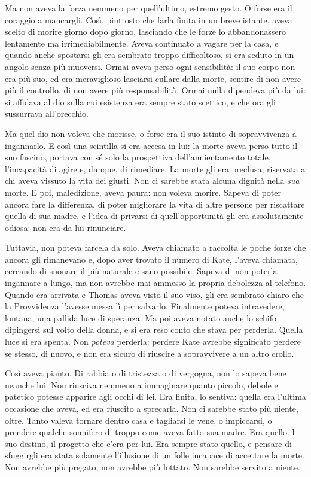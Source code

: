 \documentclass[a4paper,oneside,9pt]{memoir}
\begin{document}
Ma non aveva la forza nemmeno per quell'ultimo, estremo gesto. O forse era il coraggio a mancargli. Così, piuttosto che
farla finita in un breve istante, aveva scelto di morire giorno dopo giorno, lasciando che le forze lo abbandonassero
lentamente ma irrimediabilmente. Aveva continuato a vagare per la casa, e quando anche spostarsi gli era sembrato troppo
difficoltoso, si era seduto in un angolo senza più muoversi. Ormai aveva perso ogni sensibilità: il suo corpo non era
più suo, ed era meraviglioso lasciarsi cullare dalla morte, sentire di non avere più il controllo, di non avere più
responsabilità. Ormai nulla dipendeva più da lui: si affidava al dio sulla cui esistenza era sempre stato scettico, e
che ora gli sussurrava all'orecchio.

Ma quel dio non voleva che morisse, o forse era il suo istinto di sopravvivenza a ingannarlo. E così una scintilla si
era accesa in lui: la morte aveva perso tutto il suo fascino, portava con sé solo la prospettiva dell'annientamento
totale, l'incapacità di agire e, dunque, di rimediare. La morte gli era preclusa, riservata a chi aveva vissuto la vita
dei giusti. Non ci sarebbe stata alcuna dignità nella \emph{sua} morte. E poi, maledizione, aveva paura: non voleva
morire. Sapeva di poter ancora fare la differenza, di poter migliorare la vita di altre persone per riscattare quella di
sua madre, e l'idea di privarsi di quell'opportunità gli era assolutamente odiosa: non era da lui rinunciare.

Tuttavia, non poteva farcela da solo. Aveva chiamato a raccolta le poche forze che ancora gli rimanevano e, dopo aver
trovato il numero di Kate, l'aveva chiamata, cercando di suonare il più naturale e sano possibile. Sapeva di non poterla
ingannare a lungo, ma non avrebbe mai ammesso la propria debolezza al telefono. Quando era arrivata e Thomas aveva visto
il suo viso, gli era sembrato chiaro che la Provvidenza l'avesse messa lì per salvarlo. Finalmente poteva intravedere,
lontana, una pallida luce di speranza. Ma poi aveva notato anche lo schifo dipingersi sul volto della donna, e si era
reso conto che stava per perderla. Quella luce si era spenta. Non \emph{poteva} perderla: perdere Kate avrebbe
significato perdere se stesso, di nuovo, e non era sicuro di riuscire a sopravvivere a un altro crollo.

Così aveva pianto. Di rabbia o di tristezza o di vergogna, non lo sapeva bene neanche lui. Non riusciva nemmeno a
immaginare quanto piccolo, debole e patetico potesse apparire agli occhi di lei. Era finita, lo sentiva: quella era
l'ultima occasione che aveva, ed era riuscito a sprecarla. Non ci sarebbe stato più niente, oltre. Tanto valeva
tornare dentro casa e tagliarsi le vene, o impiccarsi, o prendere qualche sonnifero di troppo come aveva fatto sua
madre. Era quello il suo destino, il progetto che c'era per lui. Era sempre stato quello, e pensare di sfuggirgli era
stata solamente l'illusione di un folle incapace di accettare la morte. Non avrebbe più pregato, non avrebbe più
lottato. Non sarebbe servito a niente.
\end{document}
